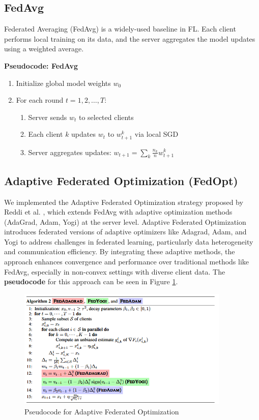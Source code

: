 \documentclass[11pt]{article}
\begin{document}
    \subsection{FedAvg}
    \label{subsec:fedavg}

    Federated Averaging (FedAvg) is a widely-used baseline in FL. Each client performs local training on its data, and the server aggregates the model updates using a weighted average.

    \textbf{Pseudocode: FedAvg}

    \begin{enumerate}
        \item Initialize global model weights $w_0$
        \item For each round $t=1,2,\dots,T$:
        \begin{enumerate}
            \item Server sends $w_t$ to selected clients
            \item Each client $k$ updates $w_t$ to $w_{t+1}^k$ via local SGD
            \item Server aggregates updates: $w_{t+1} = \sum_k \frac{n_k}{n} w_{t+1}^k$
        \end{enumerate}
    \end{enumerate}

    \subsection{Adaptive Federated Optimization (FedOpt)}
    \label{subsec:fedopt}

    We implemented the Adaptive Federated Optimization strategy proposed by Reddi et al. \cite{Reddi2020AdaptiveFO}, which extends FedAvg with adaptive optimization methods (AdaGrad, Adam, Yogi) at the server level. Adaptive Federated Optimization introduces federated versions of adaptive optimizers like Adagrad, Adam, and Yogi to address challenges in federated learning, particularly data heterogeneity and communication efficiency. By integrating these adaptive methods, the approach enhances convergence and performance over traditional methods like FedAvg, especially in non-convex settings with diverse client data. The \textbf{pseudocode} for this approach can be seen in Figure \ref{fig:fedopt_alg}.

    \begin{figure}[h!]
        \centering
        \includegraphics[width=0.9\textwidth]{img/fedopt_alg}
        \caption{Pseudocode for Adaptive Federated Optimization}
        \label{fig:fedopt_alg}
    \end{figure}
\end{document}
